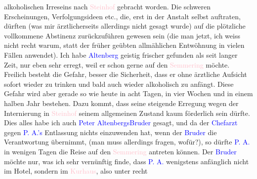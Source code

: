                alkoholischen Irreseins nach \textcolor{pink}{Steinhof}{}\ledrightnote{\textcolor{pink}{Otto-Wagner-Spital}} gebracht
               worden. Die schweren Erscheinungen, Verfolgungsideen etc., die, erst in der Anstalt
               selbst auftraten, dürften (was mir ärztlicherseits allerdings nicht gesagt wurde) auf
               die plötzliche vollkommene Abstinenz zurückzuführen gewesen sein (die man jetzt, ich
               weiss nicht recht warum, statt der früher geübten allmählichen Entwöhnung in vielen
               Fällen anwendet). Ich habe \textcolor{blue}{Altenberg}{}\ledrightnote{\textcolor{blue}{Peter Altenberg}} geistig
               frischer gefunden als seit langer Zeit, nur eben sehr erregt, weil er schon gerne auf
               den \textcolor{pink}{Semmering}{}\ledrightnote{\textcolor{pink}{Semmering}} möchte. Freilich besteht die Gefahr,
               besser die Sicherheit, dass er ohne ärztliche Aufsicht sofort wieder zu trinken und
               bald auch wieder alkoholisch {\pb}zu \label{K_L02129_2v}\label{K_L02129_2h} anfängt. Diese Gefahr wird aber gerade so
               wie heute in acht Tagen, in vier Wochen und in einem halben Jahr bestehen. Dazu
               kommt, dass seine steigende Erregung wegen der Internierung in \textcolor{pink}{Steinhof}{}\ledrightnote{\textcolor{pink}{Otto-Wagner-Spital}} seinem allgemeinen Zustand kaum förderlich sein dürfte.
               Dies alles habe ich auch \textcolor{blue}{Peter Altenbergs}{}\ledrightnote{\textcolor{blue}{Peter Altenberg}}{ }\textcolor{blue}{Bruder}{} gesagt, und da  der \textcolor{blue}{Chefarzt}{} gegen \textcolor{blue}{P. A.’s}{}\ledrightnote{\textcolor{blue}{Peter Altenberg}}
               Entlassung nichts einzuwenden hat, wenn der \textcolor{blue}{Bruder}{} die Verantwortung übernimmt, (man muss allerdings
               fragen, wofür?), so dürfte \textcolor{blue}{P. A.}{}\ledrightnote{\textcolor{blue}{Peter Altenberg}} in wenigen Tagen
               die Reise auf den \textcolor{pink}{Semmering}{}\ledrightnote{\textcolor{pink}{Semmering}} antreten können. Der \textcolor{blue}{Bruder}{} möchte nur, was ich sehr
               vernünftig finde, dass \textcolor{blue}{P. A.}{}\ledrightnote{\textcolor{blue}{Peter Altenberg}} wenigstens anfänglich
               nicht im Hotel, sondern im \textcolor{pink}{Kurhaus}{}\ledrightnote{\textcolor{pink}{Kurhaus Semmering}}, also unter recht
